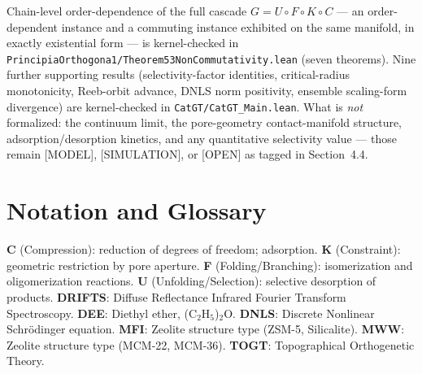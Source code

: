 \documentclass[11pt]{article}
\begin{document}
Chain-level order-dependence of the full cascade $G = U \circ F \circ K \circ C$ --- an order-dependent instance and a commuting instance exhibited on the same manifold, in exactly existential form --- is kernel-checked in \texttt{PrincipiaOrthogona1/Theorem53NonCommutativity.lean} (seven theorems). Nine further supporting results (selectivity-factor identities, critical-radius monotonicity, Reeb-orbit advance, DNLS norm positivity, ensemble scaling-form divergence) are kernel-checked in \texttt{CatGT/CatGT\_Main.lean}. What is \emph{not} formalized: the continuum limit, the pore-geometry contact-manifold structure, adsorption/desorption kinetics, and any quantitative selectivity value --- those remain [MODEL], [SIMULATION], or [OPEN] as tagged in Section~4.4.

\section{Notation and Glossary}
\textbf{C} (Compression): reduction of degrees of freedom; adsorption. \textbf{K} (Constraint): geometric restriction by pore aperture. \textbf{F} (Folding/Branching): isomerization and oligomerization reactions. \textbf{U} (Unfolding/Selection): selective desorption of products. \textbf{DRIFTS}: Diffuse Reflectance Infrared Fourier Transform Spectroscopy. \textbf{DEE}: Diethyl ether, (C$_2$H$_5$)$_2$O. \textbf{DNLS}: Discrete Nonlinear Schr\"odinger equation. \textbf{MFI}: Zeolite structure type (ZSM-5, Silicalite). \textbf{MWW}: Zeolite structure type (MCM-22, MCM-36). \textbf{TOGT}: Topographical Orthogenetic Theory.
\end{document}
